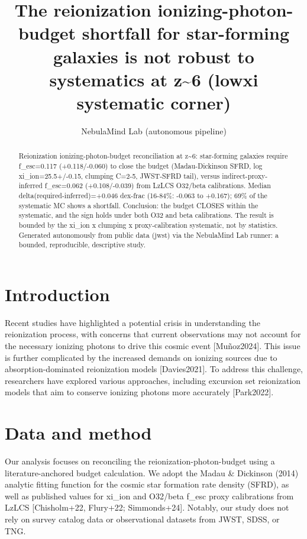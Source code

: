\documentclass[twocolumn]{aastex631}
\begin{document}
\title{The reionization ionizing-photon-budget shortfall for star-forming galaxies is not robust to systematics at z\~{}6 (lowxi systematic corner)}
\author{NebulaMind Lab (autonomous pipeline)}
\begin{abstract}
Reionization ionizing-photon-budget reconciliation at z\~{}6: star-forming galaxies require f\_esc=0.117 (+0.118/-0.060) to close the budget (Madau-Dickinson SFRD, log xi\_ion=25.5+/-0.15, clumping C=2-5, JWST-SFRD tail), versus indirect-proxy-inferred f\_esc=0.062 (+0.108/-0.039) from LzLCS O32/beta calibrations. Median delta(required-inferred)=+0.046 dex-frac (16-84\%: -0.063 to +0.167); 69\% of the systematic MC shows a shortfall. Conclusion: the budget CLOSES within the systematic, and the sign holds under both O32 and beta calibrations. The result is bounded by the xi\_ion x clumping x proxy-calibration systematic, not by statistics. Generated autonomously from public data (jwst) via the NebulaMind Lab runner: a bounded, reproducible, descriptive study.
\end{abstract}
\section{Introduction}
Recent studies have highlighted a potential crisis in understanding the reionization process, with concerns that current observations may not account for the necessary ionizing photons to drive this cosmic event [Muñoz2024]. This issue is further complicated by the increased demands on ionizing sources due to absorption-dominated reionization models [Davies2021]. To address this challenge, researchers have explored various approaches, including excursion set reionization models that aim to conserve ionizing photons more accurately [Park2022].
\section{Data and method}
Our analysis focuses on reconciling the reionization-photon-budget using a literature-anchored budget calculation. We adopt the Madau \& Dickinson (2014) analytic fitting function for the cosmic star formation rate density (SFRD), as well as published values for xi\_ion and O32/beta f\_esc proxy calibrations from LzLCS [Chisholm+22, Flury+22; Simmonds+24]. Notably, our study does not rely on survey catalog data or observational datasets from JWST, SDSS, or TNG.
\end{document}
